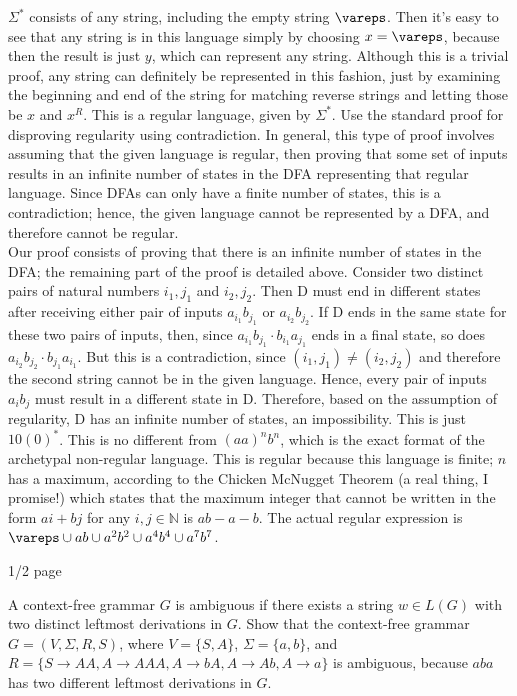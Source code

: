 \documentclass[solution, letterpaper]{cs121}
\begin{document}
\begin{solution}
\subsolution $\Sigma^*$ consists of any string, including the empty string $\vareps$.  Then it's easy to see that any string is in this language simply by choosing $x = \vareps$, because then the result is just $y$, which can represent any string.  Although this is a trivial proof, any string can definitely be represented in this fashion, just by examining the beginning and end of the string for matching reverse strings and letting those be $x$ and $x^R$.  This is a regular language, given by $\Sigma^*$.
\subsolution Use the standard proof for disproving regularity using contradiction.  In general, this type of proof involves assuming that the given language is regular, then proving that some set of inputs results in an infinite number of states in the DFA representing that regular language.  Since DFAs can only have a finite number of states, this is a contradiction; hence, the given language cannot be represented by a DFA, and therefore cannot be regular.  
\\\indent Our proof consists of proving that there is an infinite number of states in the DFA; the remaining part of the proof is detailed above.  Consider two distinct pairs of natural numbers $i_1,j_1$ and $i_2,j_2$.  Then D must end in different states after receiving either pair of inputs $a_{i_1}b_{j_1}$ or $a_{i_2}b_{j_2}$.  If D ends in the same state for these two pairs of inputs, then, since $a_{i_1}b_{j_1} \cdot b_{i_1}a_{j_1}$ ends in a final state, so does $a_{i_2}b_{j_2} \cdot b_{j_1}a_{i_1}$.  But this is a contradiction, since $(i_1,j_1) \neq (i_2,j_2)$ and therefore the second string cannot be in the given language.  Hence, every pair of inputs $a_ib_j$ must result in a different state in D.  Therefore, based on the assumption of regularity, D has an infinite number of states, an impossibility.
\subsolution This is just $10(0)^*$.
\subsolution This is no different from $(aa)^nb^n$, which is the exact format of the archetypal non-regular language.
\subsolution This is regular because this language is finite; $n$ has a maximum, according to the Chicken McNugget Theorem (a real thing, I promise!) which states that the maximum integer that cannot be written in the form $ai + bj$ for any $i, j \in \mathbb{N}$ is $ab - a - b$.  The actual regular expression is $\vareps \cup ab \cup a^2b^2 \cup a^4b^4 \cup a^7b^7$.
\end{solution}

 {1/2 page}

\subproblem
A context-free grammar $G$ is ambiguous if there exists a
string $w \in L(G)$ with two distinct leftmost derivations in $G$. Show that the context-free grammar $G = (V, \Sigma, R, S)$, where
$V=\{S,A\}$, $\Sigma = \{a,b\}$, and $R = \{S \rightarrow AA, A
\rightarrow AAA, A \rightarrow bA, A \rightarrow Ab, A \rightarrow a\}$
is ambiguous, because $aba$ has two different leftmost derivations in 
$G$.
\end{document}
